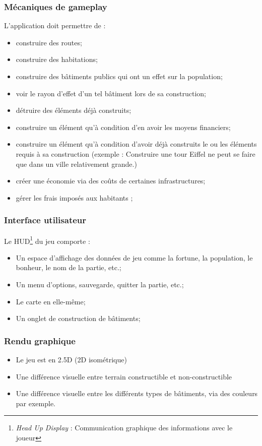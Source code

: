 \documentclass[a4paper,10pt,openany,oneside]{report}
\begin{document}
\subsubsection{Mécaniques de gameplay}
L'application doit permettre de :
\begin{itemize}
\item construire des routes;
\item construire des habitations;
\item construire des bâtiments publics qui ont un effet sur la population;
\item voir le rayon d'effet d'un tel bâtiment lors de sa construction;
\item détruire des éléments déjà construits;
\item construire un élément qu'à condition d'en avoir les moyens financiers;
\item construire un élément qu'à condition d'avoir déjà construits le ou les éléments requis à sa construction (exemple : Construire une tour Eiffel ne peut se faire que dans un ville relativement grande.)
\item créer une économie via des coûts de certaines infrastructures;
\item gérer les frais imposés aux habitants ;
\end{itemize}

\subsubsection{Interface utilisateur}
Le HUD\footnote{\textit{Head Up Display} : Communication graphique des informations avec le joueur} du jeu comporte :
\begin{itemize}
\item Un espace d'affichage des données de jeu comme la fortune, la population, le bonheur, le nom de la partie, etc.;
\item Un menu d'options, sauvegarde, quitter la partie, etc.;
\item Le carte en elle-même;
\item Un onglet de construction de bâtiments;
\end{itemize}

\subsubsection{Rendu graphique}
\begin{itemize}
\item Le jeu est en 2.5D (2D isométrique)
\item Une différence visuelle entre terrain constructible et non-constructible
\item Une différence visuelle entre les différents types de bâtiments, via des couleurs par exemple.
\end{itemize}
\end{document}
